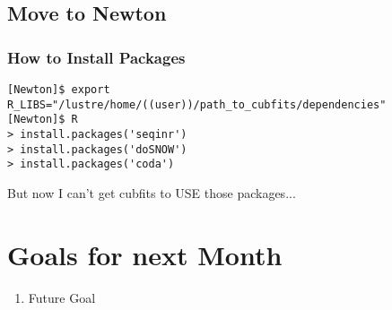 \subsection{Move to Newton}

\subsubsection{How to Install Packages}

\begin{verbatim}
[Newton]$ export R_LIBS="/lustre/home/((user))/path_to_cubfits/dependencies"
[Newton]$ R
> install.packages('seqinr')
> install.packages('doSNOW')
> install.packages('coda')
\end{verbatim}

But now I can't get cubfits to USE those packages...



\section{Goals for next Month}
\begin{enumerate}
\item Future Goal
\end{enumerate}


